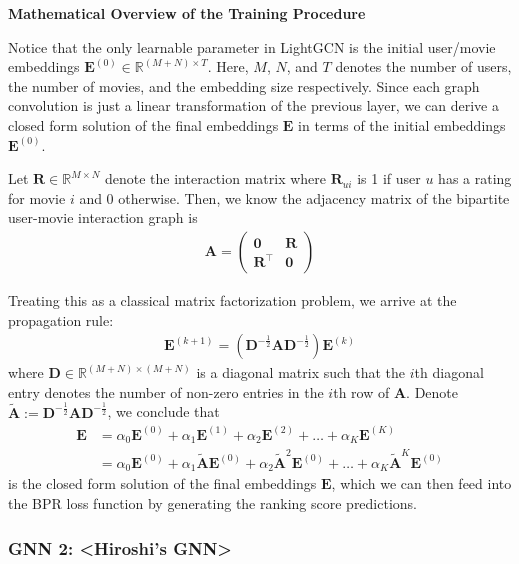\documentclass{article}
\begin{document}
\textbf{Mathematical Overview of the Training Procedure} \cite{lightgcn}

Notice that the only learnable parameter in LightGCN is the initial user/movie embeddings $\mathbf{E}^{(0)} \in \mathbb{R}^{(M + N) \times T}$. Here, $M$, $N$, and $T$ denotes the number of users, the number of movies, and the embedding size respectively. Since each graph convolution is just a linear transformation of the previous layer, we can derive a closed form solution of the final embeddings $\mathbf{E}$ in terms of the initial embeddings $\mathbf{E}^{(0)}$.

Let $\mathbf{R} \in \mathbb{R}^{M \times N}$ denote the interaction matrix where $\mathbf{R}_{ui}$ is 1 if user $u$ has a rating for movie $i$ and 0 otherwise. Then, we know the adjacency matrix of the bipartite user-movie interaction graph is
\begin{align*}
    \mathbf{A} =
    \begin{pmatrix}
    \mathbf{0} & \mathbf{R} \\
    \mathbf{R}^\top & \mathbf{0}
    \end{pmatrix}
\end{align*}

Treating this as a classical matrix factorization problem, we arrive at the propagation rule:
\begin{align*}
    \mathbf{E}^{(k+1)} = \left( \mathbf{D}^{-\frac{1}{2}} \mathbf{A} \mathbf{D}^{-\frac{1}{2}} \right) \mathbf{E}^{(k)}
\end{align*}
where $\mathbf{D} \in \mathbb{R}^{(M + N) \times (M + N)}$ is a diagonal matrix such that the $i$th diagonal entry denotes the number of non-zero entries in the $i$th row of $\mathbf{A}$. Denote $\mathbf{\tilde{A}} := \mathbf{D}^{-\frac{1}{2}} \mathbf{A} \mathbf{D}^{-\frac{1}{2}}$, we conclude that
\begin{align*}
\mathbf{E} &= \alpha_0 \mathbf{E}^{(0)} + \alpha_1 \mathbf{E}^{(1)} + \alpha_2 \mathbf{E}^{(2)} + \hdots + \alpha_K \mathbf{E}^{(K)} \\
&= \alpha_0 \mathbf{E}^{(0)} + \alpha_1 \mathbf{\tilde{A}} \mathbf{E}^{(0)} + \alpha_2 \mathbf{\tilde{A}}^2 \mathbf{E}^{(0)} + \hdots + \alpha_K \mathbf{\tilde{A}}^K \mathbf{E}^{(0)}
\end{align*}
is the closed form solution of the final embeddings $\mathbf{E}$, which we can then feed into the BPR loss function by generating the ranking score predictions.

\subsubsection{GNN 2: <Hiroshi's GNN>}
\end{document}
